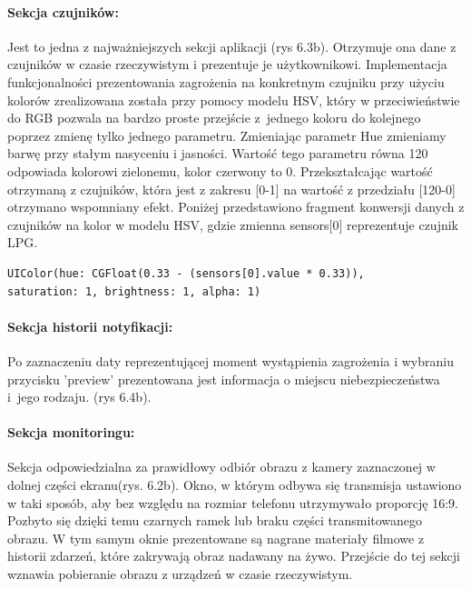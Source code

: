 \paragraph{Sekcja czujników:}
Jest to jedna z najważniejszych sekcji aplikacji (rys 6.3b).  Otrzymuje ona dane z czujników w czasie rzeczywistym i prezentuje je użytkownikowi. Implementacja funkcjonalności prezentowania zagrożenia na konkretnym czujniku przy użyciu kolorów zrealizowana została przy pomocy modelu HSV, który w przeciwieństwie do RGB pozwala na bardzo proste przejście z~jednego koloru do kolejnego poprzez zmienę tylko jednego parametru. Zmieniając parametr Hue zmieniamy barwę przy stałym nasyceniu i jasności. Wartość tego parametru równa 120\textdegree{} odpowiada kolorowi zielonemu, kolor czerwony to 0\textdegree{}. Przekształcając wartość otrzymaną z czujników, która jest z zakresu [0-1] na wartość z przedziału [120-0] otrzymano wspomniany efekt. 
Poniżej przedstawiono fragment konwersji danych z czujników na kolor w modelu HSV, gdzie zmienna sensors[0] reprezentuje czujnik LPG.
\begin{verbatim}
UIColor(hue: CGFloat(0.33 - (sensors[0].value * 0.33)),
saturation: 1, brightness: 1, alpha: 1)
\end{verbatim}


\paragraph{Sekcja historii notyfikacji:}
Po zaznaczeniu daty reprezentującej moment wystąpienia zagrożenia i wybraniu przycisku 'preview' prezentowana jest informacja o miejscu niebezpieczeństwa i~jego rodzaju. (rys 6.4b).


\paragraph{Sekcja monitoringu:}
Sekcja odpowiedzialna za prawidłowy odbiór obrazu z kamery zaznaczonej w dolnej części ekranu(rys. 6.2b). Okno, w którym odbywa się transmisja ustawiono w taki sposób, aby bez względu na rozmiar telefonu utrzymywało proporcję 16:9. Pozbyto się dzięki temu czarnych ramek lub braku części transmitowanego obrazu. W tym samym oknie prezentowane są nagrane materiały filmowe z historii zdarzeń, które zakrywają obraz nadawany na żywo. Przejście do tej sekcji wznawia pobieranie obrazu z urządzeń w czasie rzeczywistym.


